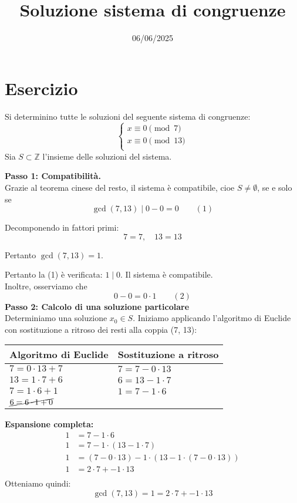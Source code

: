 \documentclass[12pt]{article}
\begin{document}
\title{Soluzione sistema di congruenze}
\date{06/06/2025}
\maketitle
\section*{Esercizio}
Si determinino tutte le soluzioni del seguente sistema di congruenze:
\[
\begin{cases}
x \equiv 0 \pmod{7} \\
x \equiv 0 \pmod{13} \\
\end{cases}
\]
Sia $S \subset \mathbb{Z}$ l'insieme delle soluzioni del sistema.

\textbf{Passo 1: Compatibilità.} \\ 
Grazie al teorema cinese del resto, il sistema è compatibile, cioe $S \neq \emptyset$, se e solo se
$$\gcd(7, 13) \mid 0 - 0 = 0 \qquad (1)$$

Decomponendo in fattori primi:
$$7 = 7, \quad 13 = 13$$

Pertanto $\gcd(7, 13) = 1$.

Pertanto la (1) è verificata: $1 \mid 0$. Il sistema è compatibile.\\
Inoltre, osserviamo che $$0 - 0 = 0 \cdot 1 \qquad (2)$$
\textbf{Passo 2: Calcolo di una soluzione particolare} \\
Determiniamo una soluzione $x_0 \in S$.
Iniziamo applicando l'algoritmo di Euclide con sostituzione a ritroso dei resti alla coppia (7, 13):
\begin{center}
\setlength{\arrayrulewidth}{0.5pt}
\begin{tabular}{|p{5cm}|p{9cm}|}
\hline
\textbf{Algoritmo di Euclide} & \textbf{Sostituzione a ritroso} \\
\hline
$7 = 0 \cdot  13 + 7$ & $7 = 7 - 0 \cdot  13$ \\
\hline
$13 = 1 \cdot  7 + 6$ & $6 = 13 - 1 \cdot  7$ \\
\hline
$7 = 1 \cdot  6 + 1$ & $1 = 7 - 1 \cdot  6$ \\
\hline
$\cancel{6 = 6 \cdot  1 + 0}$ & \\
\hline
\end{tabular}
\end{center}
\textbf{Espansione completa:}
\begin{align*}
1 &= 7 - 1\cdot6\\
1 &= 7 - 1\cdot(13 - 1\cdot7)\\
1 &= (7 - 0\cdot13) - 1\cdot(13 - 1\cdot(7 - 0\cdot13))\\
1 &= 2\cdot7 + -1\cdot13\\
\end{align*}
Otteniamo quindi: $$\gcd(7, 13) = 1 = 2 \cdot 7 + -1 \cdot 13$$
\end{document}
